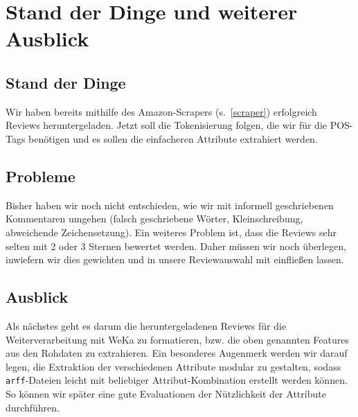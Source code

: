 \documentclass[a4paper]{article}
\newcommand{\ourextension}[1]{\texttt{#1}}
\begin{document}


\section{Stand der Dinge und weiterer Ausblick}


\subsection{Stand der Dinge}
Wir haben bereits mithilfe des Amazon-Scrapers (s.~\ref{scraper}) erfolgreich Reviews heruntergeladen.
Jetzt soll die Tokenisierung folgen, die wir für die POS-Tags benötigen und es sollen die einfacheren Attribute extrahiert werden.


\subsection{Probleme}
Bisher haben wir noch nicht entschieden, wie wir mit informell geschriebenen Kommentaren umgehen (falsch geschriebene Wörter, Kleinschreibung, abweichende Zeichensetzung).
Ein weiteres Problem ist, dass die Reviews sehr selten mit 2 oder 3 Sternen bewertet werden. Daher müssen wir noch überlegen, inwiefern wir dies gewichten und in unsere Reviewauswahl mit einfließen lassen.

\subsection{Ausblick}
Als nächstes geht es darum die heruntergeladenen Reviews für die Weiterverarbeitung mit WeKa zu formatieren, bzw. die oben genannten Features aus den Rohdaten zu extrahieren. 
Ein besonderes Augenmerk werden wir darauf legen, die Extraktion der verschiedenen Attribute modular zu gestalten, sodass \ourextension{arff}-Dateien leicht mit beliebiger Attribut-Kombination erstellt werden können.
So können wir später eine gute Evaluationen der Nützlichkeit der Attribute durchführen. 

\end{document}
